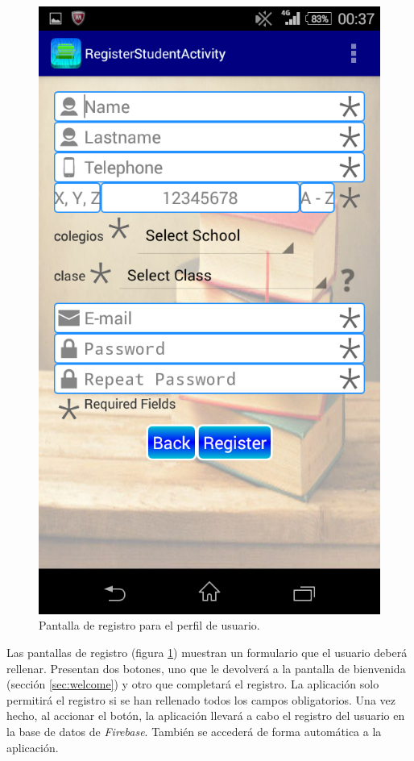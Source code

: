 		\begin{figure}[h !]
			\centering
			\includegraphics[scale=0.3]{Imagenes/App/registroAlumno}
			\caption{Pantalla de registro para el perfil de usuario.}
			\label{fig:StudentRegister}
		\end{figure}
		
		Las pantallas de registro (figura \ref{fig:StudentRegister}) muestran un formulario que el usuario deberá rellenar. Presentan dos botones, uno que le devolverá a la pantalla de bienvenida (sección \ref{sec:welcome}) y otro que completará el registro. La aplicación solo permitirá el registro si se han rellenado todos los campos obligatorios. Una vez hecho, al accionar el botón, la aplicación llevará a cabo el registro del usuario en la base de datos de {\it Firebase}. También se accederá de forma automática a la aplicación.
		
